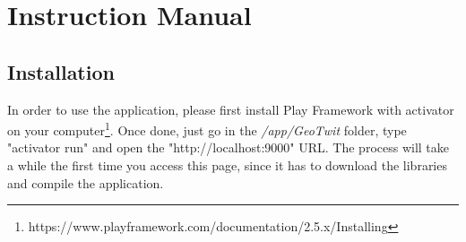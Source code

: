 \documentclass[a4paper,11pt]{report}
\begin{document}
\appendix
\chapter{Instruction Manual}
\label{instruction}
\section{Installation}
In order to use the application, please first install Play Framework with activator on your computer\footnote{https://www.playframework.com/documentation/2.5.x/Installing}. Once done, just go in the \emph{/app/GeoTwit} folder, type "activator run" and open the "http://localhost:9000" URL. The process will take a while the first time you access this page, since it has to download the libraries and compile the application.
\end{document}
